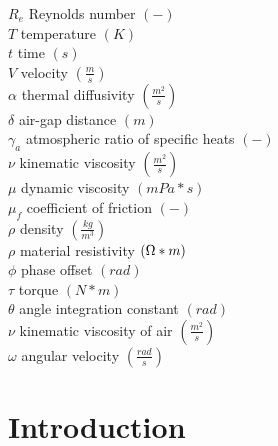 \documentclass[]{aiaa-tc}%
\begin{document}
\begin{multicols}{2}
\begin{tabbing}
  $R_{e}$ \> Reynolds number $(-)$\\
  $T$ \> temperature $(K)$\\
  $t$ \> time $(s)$\\
  $V$ \> velocity $(\frac{m}{s})$\\
  $\alpha$ \> thermal diffusivity $(\frac{m^{2}}{s})$\\
  $\delta$ \> air-gap distance $(m)$\\
  $\gamma_a$ \> atmospheric ratio of specific heats $(-)$\\
  $\nu$ \> kinematic viscosity $(\frac{m^2}{s})$\\
  $\mu$ \> dynamic viscosity $(mPa*s)$\\
  $\mu_f$ \> coefficient of friction $(-)$\\
  $\rho$ \> density $(\frac{kg}{m^{3}})$\\
  $\rho$ \> material resistivity $(\ohm*m)$\\
  $\phi$ \> phase offset $(rad)$\\
  $\tau$ \> torque $(N*m)$\\
  $\theta$ \> angle integration constant $(rad)$\\
  $\nu$ \> kinematic viscosity of air $(\frac{m^{2}}{s})$\\
  $\omega$ \> angular velocity $(\frac{rad}{s})$\\

 \end{tabbing}
\end{multicols}
\newpage


\section{Introduction}
\end{document}
